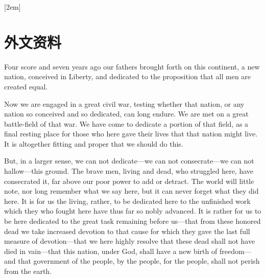 
[2em]{\vspace{.5\baselineskip}\xiaosan\song}%
             {\prechaptername\CJKnumber{\thecontentslabel}\postchaptername\qquad}{} %
             {}             %
\chapter*{外文资料}


Four score and seven years ago our fathers brought forth on this continent, a new nation, conceived in Liberty, and dedicated to the proposition that all men are created equal.

Now we are engaged in a great civil war, testing whether that nation, or any nation so conceived and so dedicated, can long endure. We are met on a great battle-field of that war. We have come to dedicate a portion of that field, as a final resting place for those who here gave their lives that that nation might live. It is altogether fitting and proper that we should do this.

But, in a larger sense, we can not dedicate—we can not consecrate—we can not hallow—this ground. The brave men, living and dead, who struggled here, have consecrated it, far above our poor power to add or detract. The world will little note, nor long remember what we say here, but it can never forget what they did here. It is for us the living, rather, to be dedicated here to the unfinished work which they who fought here have thus far so nobly advanced. It is rather for us to be here dedicated to the great task remaining before us—that from these honored dead we take increased devotion to that cause for which they gave the last full measure of devotion—that we here highly resolve that these dead shall not have died in vain—that this nation, under God, shall have a new birth of freedom—and that government of the people, by the people, for the people, shall not perish from the earth.